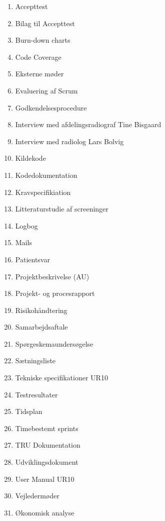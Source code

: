 \begin{enumerate}
\item Accepttest 					 					\label{Accepttest}
\item Bilag til Accepttest								\label{BilagAccepttest}
\item Burn-down charts									\label{BurnDown}
\item Code Coverage 									\label{Code Coverage}
\item Eksterne møder									\label{Eksterne moder} 
\item Evaluering af Scrum 								\label{Evaluering Scrum} 
\item Godkendelsesprocedure 							\label{Godkendelsesprocedure}
\item Interview med afdelingsradiograf Tine Bisgaard 	\label{Tine}
\item Interview med radiolog Lars Bolvig  				\label{Telefoninterview}
\item Kildekode											\label{Kildekode}
\item Kodedokumentation 								\label{Kodedokumentation} 
\item Kravspecifikiation 								\label{Kravspecifikation}
\item Litteraturstudie af screeninger						\label{Litteraturstudie}
\item Logbog											\label{Logbog}
\item Mails												\label{Mails}
\item Patientsvar										\label{Patientsvar} 
\item Projektbeskrivelse (AU) 							\label{Projektbeskrivelse}
\item Projekt- og procesrapport 						\label{Projekt- og procesrapport}
\item Risikohåndtering 									\label{Risikohandtering} 
\item Samarbejdsaftale									\label{Samarbejdsaftale} 
\item Spørgeskemaundersøgelse 							\label{Sporgeskemaundersogelse}
\item Sætningsliste 									\label{Satningsliste}
\item Tekniske specifikationer UR10						\label{UR10spec}
\item Testresultater 									\label{TestResultater}
\item Tidsplan											\label{Tidsplan}
\item Timebestemt sprints 								\label{Timebestemt sprints}
\item TRU Dokumentation 								\label{TRUDokumentation}
\item Udviklingsdokument 								\label{Udviklingsdokument}
\item User Manual UR10 									\label{UserManualUR10}
\item Vejledermøder										\label{Vejledermoder}
\item Økonomisk analyse					\label{Okonomi}
\end{enumerate}



